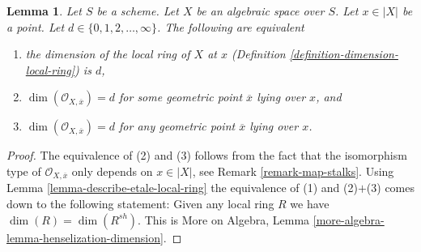 \documentclass[10pt,a4paper]{amsart}
\theoremstyle{plain}
\newtheorem{lemma}[subsection]{Lemma}
\theoremstyle{definition}
\theoremstyle{remark}
\numberwithin{equation}{subsection}
\begin{document}
\begin{lemma}
\label{lemma-dimension-local-ring}
Let $S$ be a scheme. Let $X$ be an algebraic space over $S$.
Let $x \in |X|$ be a point. Let $d \in \{0, 1, 2, \ldots, \infty\}$.
The following are equivalent
\begin{enumerate}
\item the dimension of the local ring of $X$ at $x$
(Definition \ref{definition-dimension-local-ring}) is $d$,
\item $\dim(\mathcal{O}_{X, \overline{x}}) = d$ for some geometric
point $\overline{x}$ lying over $x$, and
\item $\dim(\mathcal{O}_{X, \overline{x}}) = d$ for any geometric
point $\overline{x}$ lying over $x$.
\end{enumerate}
\end{lemma}

\begin{proof}
The equivalence of (2) and (3) follows from the fact that the
isomorphism type of $\mathcal{O}_{X, \overline{x}}$ only depends
on $x \in |X|$, see Remark \ref{remark-map-stalks}.
Using Lemma \ref{lemma-describe-etale-local-ring}
the equivalence of (1) and (2)$+$(3) comes down to the
following statement: Given any local ring $R$ we have
$\dim(R) = \dim(R^{sh})$. This is
More on Algebra, Lemma \ref{more-algebra-lemma-henselization-dimension}.
\end{proof}
\end{document}
